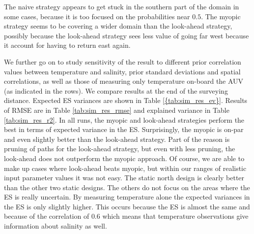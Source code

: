 \documentclass[aoas]{imsart}
\begin{document}
The naive strategy appears to get stuck in the southern part of the
domain in some cases, because it is too focused on the probabilities
near $0.5$. The myopic strategy seems to be covering a wider domain than
the look-ahead strategy, possibly because the look-ahead strategy sees
less value of going far west because it account for having to return
east again.

We further go on to study sensitivity of the result to different prior correlation values between temperature and salinity, prior standard deviations and spatial correlations, as well as those of measuring only temperature on-board the AUV (as indicated in the rows). We compare results at the end of the surveying distance. Expected ES variances are shown in Table \ref{{tab:sim_res_ev}}. Results of RMSE are in Table \ref{tab:sim_res_rmse} and explained variance in Table \ref{tab:sim_res_r2}. 
In all runs, the myopic and look-ahead strategies perform the best in terms of expected variance in the ES. Surprisingly, the myopic is on-par and even slightly better than the look-ahead strategy. Part of the reason is pruning of paths for the look-ahead strategy, but even with less pruning, the look-ahead does not outperform the myopic approach. Of course, we are able to make up cases where look-ahead beats myopic, but within our ranges of realistic input parameter values it was not easy.
The static north design is clearly better than the other two static designs. The others do not focus on the areas where the ES is really uncertain. 
By measuring temperature alone the expected variances in the ES is only slightly higher. This occurs because the ES is almost the same and because of the correlation of $0.6$ which means that temperature observations give information about salinity as well. 
\end{document}
